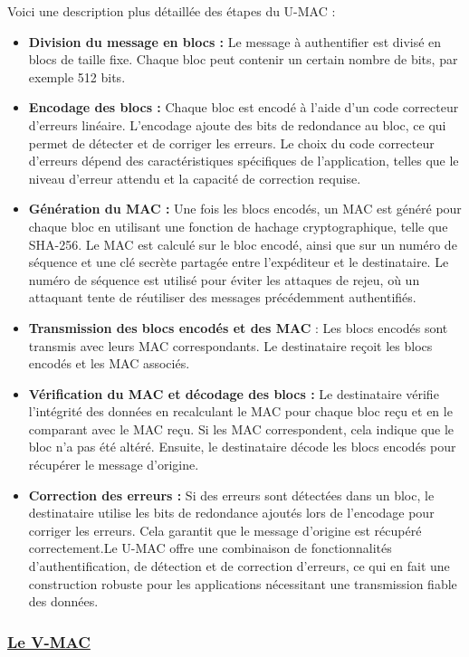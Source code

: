 Voici une description plus détaillée des étapes du U-MAC :
\begin{itemize}[label=$\cdot$]
    \item \textbf{Division du message en blocs :} Le message à authentifier est divisé en blocs de taille fixe. Chaque bloc peut contenir un certain nombre de bits, par exemple 512 bits.
    \item \textbf{Encodage des blocs :} Chaque bloc est encodé à l'aide d'un code correcteur d'erreurs linéaire. L'encodage ajoute des bits de redondance au bloc, ce qui permet de détecter et de corriger les erreurs. Le choix du code correcteur d'erreurs dépend des caractéristiques spécifiques de l'application, telles que le niveau d'erreur attendu et la capacité de correction requise.
    \item \textbf{Génération du MAC :} Une fois les blocs encodés, un MAC est généré pour chaque bloc en utilisant une fonction de hachage cryptographique, telle que SHA-256. Le MAC est calculé sur le bloc encodé, ainsi que sur un numéro de séquence et une clé secrète partagée entre l'expéditeur et le destinataire. Le numéro de séquence est utilisé pour éviter les attaques de rejeu, où un attaquant tente de réutiliser des messages précédemment authentifiés.
    \item \textbf{Transmission des blocs encodés et des MAC }: Les blocs encodés sont transmis avec leurs MAC correspondants. Le destinataire reçoit les blocs encodés et les MAC associés.
    \item \textbf{Vérification du MAC et décodage des blocs :} Le destinataire vérifie l'intégrité des données en recalculant le MAC pour chaque bloc reçu et en le comparant avec le MAC reçu. Si les MAC correspondent, cela indique que le bloc n'a pas été altéré. Ensuite, le destinataire décode les blocs encodés pour récupérer le message d'origine.
    \item \textbf{Correction des erreurs :} Si des erreurs sont détectées dans un bloc, le destinataire utilise les bits de redondance ajoutés lors de l'encodage pour corriger les erreurs. Cela garantit que le message d'origine est récupéré correctement.Le U-MAC offre une combinaison de fonctionnalités d'authentification, de détection et de correction d'erreurs, ce qui en fait une construction robuste pour les applications nécessitant une transmission fiable des données.
\end{itemize} 
\newpage

\subsubsection{\textbf{\underline{Le V-MAC}}}

